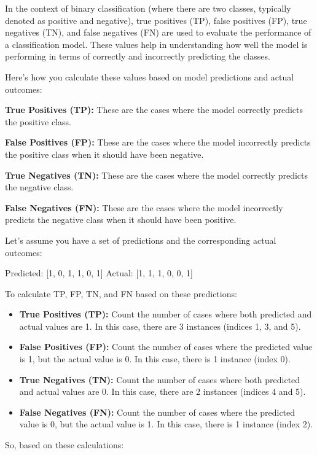 \documentclass[a4paper,conference]{IEEEtran}
\begin{document}
In the context of binary classification (where there are two classes,
typically denoted as positive and negative), true positives (TP), false
positives (FP), true negatives (TN), and false negatives (FN) are used
to evaluate the performance of a classification model. These values help
in understanding how well the model is performing in terms of correctly
and incorrectly predicting the classes.

Here's how you calculate these values based on model predictions and
actual outcomes:

\textbf{True Positives (TP):} These are the cases where the model
correctly predicts the positive class.

\textbf{False Positives (FP):} These are the cases where the model
incorrectly predicts the positive class when it should have been
negative.

\textbf{True Negatives (TN):} These are the cases where the model
correctly predicts the negative class.

\textbf{False Negatives (FN):} These are the cases where the model
incorrectly predicts the negative class when it should have been
positive.

Let's assume you have a set of predictions and the corresponding actual
outcomes:

Predicted: {[}1, 0, 1, 1, 0, 1{]} Actual: {[}1, 1, 1, 0, 0, 1{]}

To calculate TP, FP, TN, and FN based on these predictions:

\begin{itemize}
\item
  \textbf{True Positives (TP):} Count the number of cases where both
  predicted and actual values are 1. In this case, there are 3 instances
  (indices 1, 3, and 5).
\item
  \textbf{False Positives (FP):} Count the number of cases where the
  predicted value is 1, but the actual value is 0. In this case, there
  is 1 instance (index 0).
\item
  \textbf{True Negatives (TN):} Count the number of cases where both
  predicted and actual values are 0. In this case, there are 2 instances
  (indices 4 and 5).
\item
  \textbf{False Negatives (FN):} Count the number of cases where the
  predicted value is 0, but the actual value is 1. In this case, there
  is 1 instance (index 2).
\end{itemize}

So, based on these calculations:
\end{document}
